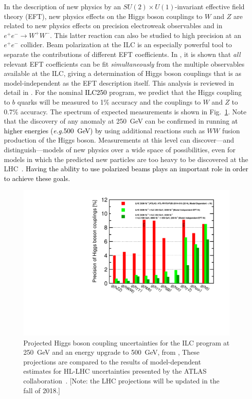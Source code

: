 \documentclass[%
 reprint,
 amsmath,amssymb,
 aps,
]{revtex4-1}
\newcommand{\juan}[1]{\textcolor{black}{{#1}}}
\def\eg{{\it e.g.}}
\def\Fig#1{Fig.~\ref{#1}}
\def\ee{e^+e^-}
\begin{document}
In the description of new physics by an  $SU(2)\times U(1)$-invariant
effective field theory (EFT), new physics effects on the  Higgs boson
couplings to $W$ and $Z$ are related to new physics effects on
precision electroweak observables and in $\ee\to W^+W^-$.   This
latter reaction can also be studied to high precision at an $\ee$
collider.  Beam polarization at the ILC is an especially powerful tool
to separate the contributions of different EFT
coefficients. In \cite{Barklow:2017suo}, it is shown that {\it all}
relevant EFT coefficients can be fit {\it simultaneously} from the multiple
observables available at the ILC, giving a 
determination of Higgs boson couplings that is as
model-independent as the EFT description itself. 
 This analysis is reviewed in detail in \cite{ILCforESS}. 
For the nominal \juan{ILC250} program, we predict that the Higgs
coupling to $b$ quarks will be measured to 1\% accuracy and the
couplings to $W$ and $Z$ to 0.7\% accuracy.  The spectrum of  expected
measurements is shown in \Fig{fig:Higgssummary}.  Note that the 
discovery of any anomaly at 250~GeV can be confirmed in running \juan{at higher energies (\eg 500~GeV) by}
using additional reactions  such as $WW$ fusion production of the
Higgs boson.   Measurements at this level can discover---and distinguish---models of new physics over a
wide space of possibilities, even for models in which the predicted new
particles are too heavy to be discovered at the LHC~\cite{Barklow:2017suo}. \juan{Having the ability to 
use polarized beams plays an important role in order to achieve these goals.}

\begin{figure}
\begin{center}
\includegraphics[width=0.95\hsize]{figures/DeltaH_EFT.pdf}
\end{center}
\caption{Projected Higgs boson coupling uncertainties for the ILC
  program at 250~GeV and an energy upgrade to 500~GeV, from \cite{Fujii:2017vwa}, 
 These projections are compared to
  the results of model-dependent estimates for HL-LHC uncertainties 
presented by the ATLAS 
collaboration~\cite{H2aaLHC}. [Note: the LHC projections will be
updated in the fall of 2018.]}
\label{fig:Higgssummary}
\end{figure}
\end{document}
